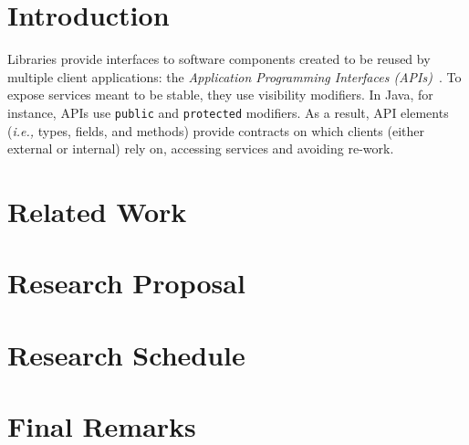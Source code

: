 \documentclass[11pt, a4paper]{article}
\newcommand{\ie}{\emph{i.e.,}\xspace}
\begin{document}


\section{Introduction} %

Libraries provide interfaces to software components created to be reused by multiple client applications: the \emph{Application Programming Interfaces (APIs)}~\citep{reddy2011api,apiDef}.
To expose services meant to be stable, they use visibility modifiers. 
In Java, for instance, APIs use \texttt{public} and \texttt{protected} modifiers.
As a result, API elements (\ie types, fields, and methods) provide contracts on which clients (either external or internal) rely on, accessing services and avoiding re-work.



\section{Related Work} %
\label{sec:literatura}




\section{Research Proposal} %
\label{sec:proposta}


\section{Research Schedule} %
\label{sec:cronograma}


\section{Final Remarks} %
\label{sec:conclusao}






\end{document}
